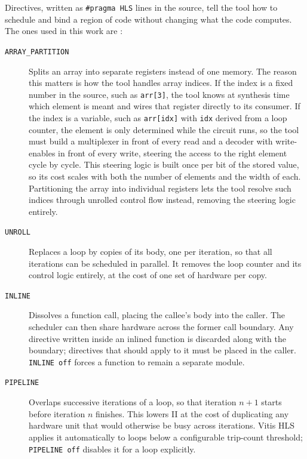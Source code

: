 \documentclass[12pt,a4paper]{article}
\begin{document}
Directives, written as \texttt{\#pragma HLS} lines in the source,
tell the tool how to schedule and bind a region of code without
changing what the code computes. The ones used in this work are
\citep{amd_ug1399}:

\begin{description}
  \item[\texttt{ARRAY\_PARTITION}] Splits an array into separate
        registers instead of one memory. The reason this matters is
        how the tool handles array indices. If the index is a fixed
        number in the source, such as \texttt{arr[3]}, the tool
        knows at synthesis time which element is meant and wires
        that register directly to its consumer. If the index is a
        variable, such as \texttt{arr[idx]} with \texttt{idx}
        derived from a loop counter, the element is only determined
        while the circuit runs, so the tool must build a multiplexer
        in front of every read and a decoder with write-enables in
        front of every write, steering the access to the right
        element cycle by cycle. This steering logic is built once
        per bit of the stored value, so its cost scales with both
        the number of elements and the width of each. Partitioning
        the array into individual registers lets the tool resolve
        such indices through unrolled control flow instead, removing
        the steering logic entirely.
        
  \item[\texttt{UNROLL}] Replaces a loop by copies of its body, one
        per iteration, so that all iterations can be scheduled in
        parallel. It removes the loop counter and its control logic
        entirely, at the cost of one set of hardware per copy.
  \item[\texttt{INLINE}] Dissolves a function call, placing the
        callee's body into the caller. The scheduler can then share
        hardware across the former call boundary. Any directive
        written inside an inlined function is discarded along with
        the boundary; directives that should apply to it must be
        placed in the caller. \texttt{INLINE off} forces a function
        to remain a separate module.
        
  \item[\texttt{PIPELINE}] Overlaps successive iterations of a
        loop, so that iteration $n{+}1$ starts before iteration $n$
        finishes. This lowers II at the cost of duplicating any
        hardware unit that would otherwise be busy across
        iterations. Vitis HLS applies it automatically to loops
        below a configurable trip-count threshold; \texttt{PIPELINE
        off} disables it for a loop explicitly.
        

\end{description}
\end{document}
